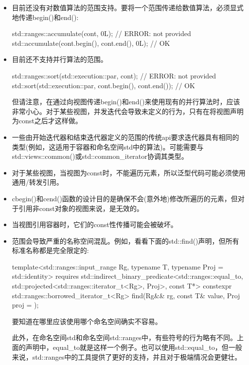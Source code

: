 \begin{itemize}
\item
目前还没有对数值算法的范围支持。要将一个范围传递给数值算法，必须显式地传递begin()和end():

\begin{cpp}
std::ranges::accumulate(cont, 0L); // ERROR: not provided
std::accumulate(cont.begin(), cont.end(), 0L); // OK
\end{cpp}

\item
目前还不支持并行算法的范围。

\begin{cpp}
std::ranges::sort(std::execution::par, cont); // ERROR: not provided
std::sort(std::execution::par, cont.begin(), cont.end()); // OK
\end{cpp}

但请注意，在通过向视图传递begin()和end()来使用现有的并行算法时，应该非常小心。对于某些视图，并发迭代会导致未定义的行为，只有在将视图声明为const之后才这样做。

\item
一些由开始迭代器和结束迭代器定义的范围的传统api要求迭代器具有相同的类型(例如，这适用于容器和命名空间std中的算法)。可能需要与std::views::common()或std::common\_iterator协调其类型。

\item
对于某些视图，当视图为const时，不能遍历元素，所以泛型代码可能必须使用通用/转发引用。

\item
cbegin()和cend()函数的设计目的是确保不会(意外地)修改所遍历的元素，但对于引用非const对象的视图来说，是无效的。

\item
当视图引用容器时，它们的const性传播可能会被破坏。

\item
范围会导致严重的名称空间混乱。例如，看看下面的std::find()声明，但所有标准名称都是完全限定的:

\begin{cpp}
template<std::ranges::input_range Rg,
				typename T,
				typename Proj = std::identity>
requires std::indirect_binary_predicate<std::ranges::equal_to,
									std::projected<std::ranges::iterator_t<Rg>, Proj>,
									const T*>
constexpr std::ranges::borrowed_iterator_t<Rg>
	find(Rg&& rg, const T& value, Proj proj = {});
\end{cpp}

要知道在哪里应该使用哪个命名空间确实不容易。

此外，在命名空间std和命名空间std::ranges中，有些符号的行为略有不同。上面的声明中，equal\_to就是这样一个例子。也可以使用std::equal\_to，但一般来说，std::ranges中的工具提供了更好的支持，并且对于极端情况会更健壮。
\end{itemize}














